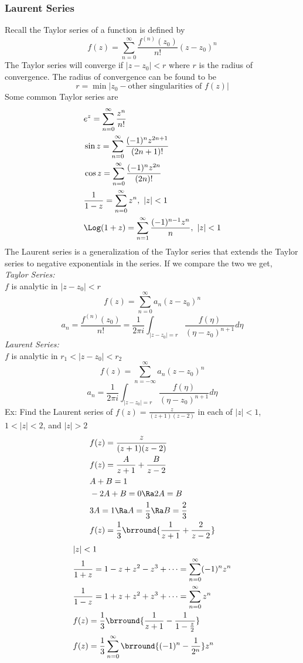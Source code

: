 \subsubsection{Laurent Series}
Recall the Taylor series of a function is defined by
\[f(z)=\sum_{n=0}^\infty\frac{f^{(n)}(z_0)}{n!}(z-z_0)^n\]
The Taylor series will converge if $|z-z_0|<r$ where $r$ is the radius of convergence. The radius of convergence can be found to be
\[r=\min|z_0-\text{other singularities of }f(z)|\]
Some common Taylor series are
\begin{align*}
    &e^z=\sum_{n=0}^\infty\frac{z^n}{n!}\\
    &\sin z=\sum_{n=0}^\infty\frac{(-1)^nz^{2n+1}}{(2n+1)!}\\
    &\cos z=\sum_{n=0}^\infty\frac{(-1)^nz^{2n}}{(2n)!}\\
    &\frac{1}{1-z}=\sum_{n=0}^\infty z^n,\ |z|<1\\
    &\Log(1+z)=\sum_{n=1}^\infty\frac{(-1)^{n-1}z^n}{n},\ |z|<1
\end{align*}
The Laurent series is a generalization of the Taylor series that extends the Taylor series to negative exponentials in the series. If we compare the two we get,\\
\textit{Taylor Series:}\\
$f$ is analytic in $|z-z_0|<r$
\[f(z)=\sum_{n=0}^\infty a_n(z-z_0)^n\]
\[a_n=\frac{f^{(n)}(z_0)}{n!}=\frac{1}{2\pi i}\int_{|z-z_0|=r}\frac{f(\eta)}{(\eta-z_0)^{n+1}}d\eta\]
\textit{Laurent Series:}\\
$f$ is analytic in $r_1<|z-z_0|<r_2$
\[f(z)=\sum_{n=-\infty}^\infty a_n(z-z_0)^n\]
\[a_n=\frac{1}{2\pi i}\int_{|z-z_0|=r}\frac{f(\eta)}{(\eta-z_0)^{n+1}}d\eta\]
Ex: Find the Laurent series of $f(z)=\frac{z}{(z+1)(z-2)}$ in each of $|z|<1$, $1<|z|<2$, and $|z|>2$
\begin{align*}
    &f(z)=\frac{z}{(z+1)(z-2)}\\
    &f(z)=\frac{A}{z+1}+\frac{B}{z-2}\\
    &A+B=1\\
    &-2A+B=0\Ra 2A=B\\
    &3A=1\Ra A=\frac{1}{3}\Ra B=\frac{2}{3}\\
    &f(z)=\frac{1}{3}\brround{\frac{1}{z+1}+\frac{2}{z-2}}
\end{align*}
\begin{align*}
    &|z|<1\\
    &\frac{1}{1+z}=1-z+z^2-z^3+\cdots=\sum_{n=0}^\infty(-1)^nz^n\\
    &\frac{1}{1-z}=1+z+z^2+z^3+\cdots=\sum_{n=0}^\infty z^n\\
    &f(z)=\frac{1}{3}\brround{\frac{1}{z+1}-\frac{1}{1-\frac{z}{2}}}\\
    &f(z)=\frac{1}{3}\sum_{n=0}^\infty\brround{(-1)^n-\frac{1}{2^n}}z^n
\end{align*}
